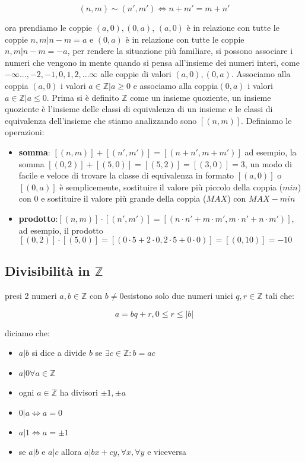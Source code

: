 \documentclass{article}
\begin{document}
        \begin{equation}
            (n,m)\sim(n',m')\iff n+m'=m+n'
        \end{equation}
        
        ora prendiamo le coppie $(a,0),(0,a)$, $(a,0)$ è in relazione con tutte le coppie $n,m|n-m=a$ e $(0,a)$ è in relazione con tutte le coppie $n,m|n-m=-a$, per rendere la situazione più familiare, si possono associare i numeri che vengono in mente quando si pensa all'insieme dei numeri interi, come $-\infty...,-2,-1,0,1,2,...\infty$ alle coppie di valori $(a,0),(0,a)$. Associamo alla coppia $(a,0)$ i valori $a\in\mathbb{Z}|a\ge0$ e associamo alla coppia$(0,a)$ i valori $a\in\mathbb{Z}|a\le0$.
        Prima si è definito $\mathbb{Z}$ come un insieme quoziente, un insieme quoziente è l'insieme delle classi di equivalenza di un insieme e le classi di equivalenza dell'insieme che stiamo analizzando sono $[(n,m)]$.
        Definiamo le operazioni:

        \begin{itemize}
            \item \textbf{somma}: $[(n,m)]+[(n',m')]=[(n+n',m+m')]$ ad esempio, la somma $[(0,2)]+[(5,0)]=[(5,2)]=[(3,0)]=3$, un modo di facile e veloce di trovare la classe di equivalenza in formato $[(a,0)]$ o $[(0,a)]$ è semplicemente, sostituire il valore più piccolo della coppia ($min$) con $0$ e sostituire il valore più grande della coppia ($MAX$) con $MAX-min$
            \item \textbf{prodotto}:$[(n,m)]\cdot[(n',m')]=[(n\cdot n'+m\cdot m', m\cdot n'+n\cdot m')]$, ad esempio, il prodotto $[(0,2)]\cdot[(5,0)]=[(0\cdot5+2\cdot0,2\cdot5+0\cdot 0)]=[(0,10)]=-10$
        \end{itemize}
    
    \subsection{Divisibilità in $\mathbb{Z}$}
        presi 2 numeri $a,b\in\mathbb{Z}$ con $b\neq 0$esistono solo due numeri unici $q,r\in\mathbb{Z}$ tali che:

        \begin{equation}
        a=bq+r, 0\leq r \leq |b|
        \end{equation}
        
        diciamo che:
        
        \begin{itemize}
            \item $a|b$ si dice a divide $b$ se $\exists c \in \mathbb{Z}:b=ac$
            \item $a|0\forall a\in \mathbb{Z}$
            \item ogni $a\in \mathbb{Z}$ ha divisori $\pm1,\pm a$
            \item $0|a \iff a=0$
            \item $a|1\iff a=\pm1$
            \item se $a|b$ e $a|c$ allora $a|bx+cy, \forall x,\forall y$ e viceversa
        \end{itemize}
    
\end{document}
